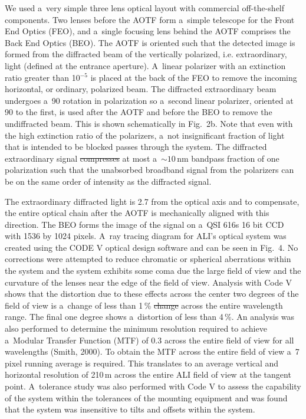 \documentclass[amtd, online, hvmath]{copernicus}
\providecommand{\DIFadd}[1]{{\protect\color{blue}\uwave{#1}}} %
\providecommand{\DIFdel}[1]{{\protect\color{red}\sout{#1}}}                      %
\providecommand{\DIFaddbegin}{} %
\providecommand{\DIFaddend}{} %
\providecommand{\DIFdelbegin}{} %
\providecommand{\DIFdelend}{} %
\begin{document}
We used a~very simple three lens optical layout with commercial
off-the-shelf components. Two lenses before the AOTF form a~simple
telescope for the Front End Optics (FEO), and a~single focusing lens
behind the AOTF comprises the Back End Optics (BEO). The AOTF is
oriented such that the detected image is formed from the diffracted
beam of the vertically polarized, i.e. extraordinary, light (defined
at the entrance aperture).  A~linear polarizer with an extinction
ratio greater than 10\DIFdelbegin \DIFdel{$^{-5}$ }\DIFdelend \DIFaddbegin \DIFadd{$^{5}$ }\DIFaddend is placed at the back of the FEO to
remove the incoming horizontal, or ordinary, polarized beam. The
diffracted extraordinary beam undergoes a~90{\degree} rotation in
polarization so a~second linear polarizer, oriented at 90{\degree} to
the first, is used after the AOTF and before the BEO to remove the
undiffracted beam. This is shown schematically in Fig.~2b. Note that
even with the high extinction ratio of the polarizers, a~not
insignificant fraction of light that is intended to be blocked passes
through the system.  The diffracted extraordinary signal \DIFdelbegin \DIFdel{compresses }\DIFdelend \DIFaddbegin \DIFadd{comprises }\DIFaddend at
most a~$\sim 10$\,\unit{nm} bandpass fraction of one polarization such
that the unabsorbed broadband signal from the polarizers can be on the
same order of intensity as the diffracted signal.

The extraordinary diffracted light is 2.7{\degree} from the optical
axis and to compensate, the entire optical chain after the AOTF is
mechanically aligned with this direction. The BEO forms the image of
the signal on a~QSI 616s 16 bit CCD with 1536 by 1024 pixels. A~ray
tracing diagram for ALI's optical system was created using the CODE V
optical design software and can be seen in Fig.~4. No corrections were
attempted to reduce chromatic or spherical aberrations within the
system and the system exhibits some coma due the large field of view
and the curvature of the lenses near the edge of the field of
view. Analysis with Code V shows that the distortion due to these
effects across the center two degrees of the field of view is a~change
of less than 1\,{\%} \DIFdelbegin \DIFdel{change }\DIFdelend across the entire wavelength range. The
final one degree shows a~distortion of less than 4\,{\%}. An analysis
was also performed to determine the minimum resolution required to
achieve a~Modular Transfer Function (MTF) of 0.3 across the entire
field of view for all wavelengths (Smith, 2000). To obtain the MTF
across the entire field of view a~7 pixel running average is
required. This translates to an average vertical and horizontal
resolution of 210\,\unit{m} across the entire ALI field of view at the
tangent point. A~tolerance study was also performed with Code V to
assess the capability of the system within the tolerances of the
mounting equipment and was found that the system was insensitive to
tilts and offsets within the system.
\end{document}
